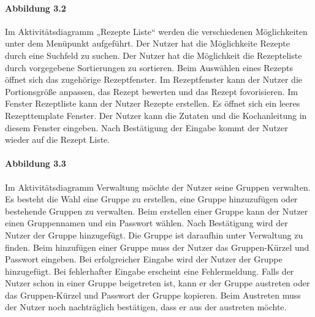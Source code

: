 \documentclass[parskip=full]{scrartcl}
\begin{document}
\paragraph{Abbildung 3.2}
Im Aktivitätsdiagramm „Rezepte Liste“ werden die verschiedenen Möglichkeiten unter dem Menüpunkt aufgeführt.
Der Nutzer hat die Möglichkeite Rezepte durch eine Suchfeld zu suchen.
Der Nutzer hat die Möglichkeit die Rezepteliste durch vorgegebene Sortierungen zu sortieren.
Beim Auswählen eines Rezepts öffnet sich das zugehörige Rezeptfenster.
Im Rezeptfenster kann der Nutzer die Portionsgröße anpassen, das Rezept bewerten und das Rezept fovorisieren.
Im Fenster Rezeptliste kann der Nutzer Rezepte erstellen.
Es öffnet sich ein leeres Rezepttemplate Fenster.
Der Nutzer kann die Zutaten und die Kochanleitung in diesem Fenster eingeben.
Nach Bestätigung der Eingabe kommt der Nutzer wieder auf die Rezept Liste.

\paragraph{Abbildung 3.3}
Im Aktivitätsdiagramm Verwaltung  möchte der Nutzer seine Gruppen verwalten.
Es besteht die Wahl eine Gruppe zu erstellen, eine Gruppe hinzuzufügen oder bestehende Gruppen zu verwalten.
Beim erstellen einer Gruppe kann der Nutzer einen Gruppennamen und ein Passwort wählen.
Nach Bestätigung wird der Nutzer der Gruppe hinzugefügt.
Die Gruppe ist daraufhin unter Verwaltung zu finden.
Beim hinzufügen einer Gruppe muss der Nutzer das Gruppen-Kürzel und Passwort eingeben.
Bei erfolgreicher Eingabe wird der Nutzer der Gruppe hinzugefügt.
Bei fehlerhafter Eingabe erscheint eine Fehlermeldung.
Falls der Nutzer schon in einer Gruppe beigetreten ist, kann er der Gruppe austreten oder das Gruppen-Kürzel und Passwort der Gruppe kopieren.
Beim Austreten muss der Nutzer noch nachträglich bestätigen, dass er aus der austreten möchte.
\newpage
\end{document}
